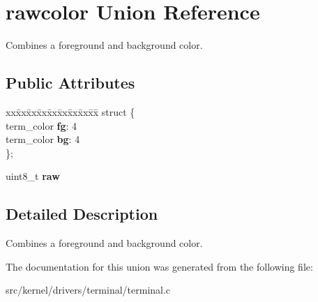 \hypertarget{unionrawcolor}{}\section{rawcolor Union Reference}
\label{unionrawcolor}


Combines a foreground and background color.  


\subsection*{Public Attributes}
\begin{DoxyCompactItemize}
\item 
\mbox{\label{unionrawcolor_ae6b7ffec15c72b108f63283a8d2dbec4}} 
\begin{tabbing}
xx\=xx\=xx\=xx\=xx\=xx\=xx\=xx\=xx\=\kill
struct \{\\
\>term\_color {\bfseries fg}: 4\\
\>term\_color {\bfseries bg}: 4\\
\}; \\

\end{tabbing}\item 
\mbox{\label{unionrawcolor_ad171475c0322f622c65c536bdd8f66b0}} 
uint8\+\_\+t {\bfseries raw}
\end{DoxyCompactItemize}


\subsection{Detailed Description}
Combines a foreground and background color. 

The documentation for this union was generated from the following file\+:\begin{DoxyCompactItemize}
\item 
src/kernel/drivers/terminal/terminal.\+c\end{DoxyCompactItemize}
